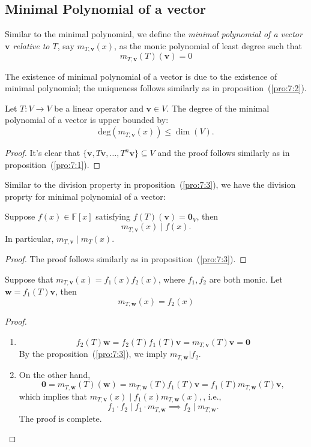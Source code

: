 \subsection{Minimal Polynomial of a vector}

\begin{definition}
Similar to the minimal polynomial, we define the \emph{minimal polynomial of a vector $\bm v$ relative to $T$}, say $m_{T,\bm v}(x)$, as the monic polynomial of least degree such that 
\[
m_{T,\bm v}(T)(\bm v)=0
\]
\end{definition}
The existence of minimal polynomial of a vector is due to the existence of minimal polynomial; the uniqueness follows similarly as in proposition~(\ref{pro:7:2}).

\begin{proposition}
Let $T:V\to V$ be a linear operator and $\bm v\in V$.
The degree of the minimal polynomial of a vector is upper bounded by:
\[
\text{deg}(m_{T,\bm v}(x))\le \dim (V).
\]
\end{proposition}
\begin{proof}
It's clear that $\{\bm v,T\bm v,\dots,T^n\bm v\}\subseteq V$ and the proof follows similarly as in proposition~(\ref{pro:7:1}).
\end{proof}

Similar to the division property in proposition~(\ref{pro:7:3}), we have the division proprty for minimal polynomial of a vector:
\begin{proposition}\label{pro:7:6}
Suppose $f(x)\in\mathbb{F}[x]$ satisfying $f(T)(\bm v)=\bm0_{V}$, then
\[
m_{T,\bm v}(x)\mid f(x).
\]
In particular, $m_{T,\bm v}\mid m_T(x)$.
\end{proposition}

\begin{proof}
The proof follows similarly as in proposition~(\ref{pro:7:3}).
\end{proof}

\begin{proposition}
Suppose that $m_{T,\bm v}(x)= f_1(x)f_2(x)$, where $f_1,f_2$ are both monic. Let $\bm w = f_1(T)\bm v$, then
\[
m_{T,\bm w}(x) = f_2(x)
\]
\end{proposition}
\begin{proof}
\begin{enumerate}
\item
\[
f_2(T)\bm w = f_2(T)f_1(T)\bm v = m_{T,\bm v}(T)\bm v=\bm0
\]
By the proposition~(\ref{pro:7:3}), we imply 
$
m_{T,\bm w}|f_2
$.
\item
On the other hand,
\[
\bm0 = m_{T,\bm w}(T)(\bm w) = m_{T,\bm w}(T)f_1(T)\bm v= f_1(T)m_{T,\bm w}(T)\bm v,
\]
which implies that $m_{T,\bm v}(x)\mid f_1(x)m_{T,\bm w}(x),$, i.e.,
\[
f_1\cdot f_2\mid f_1\cdot m_{T,\bm w}\implies
f_2\mid m_{T,\bm w}.
\]
The proof is complete.
\end{enumerate}
\end{proof}















